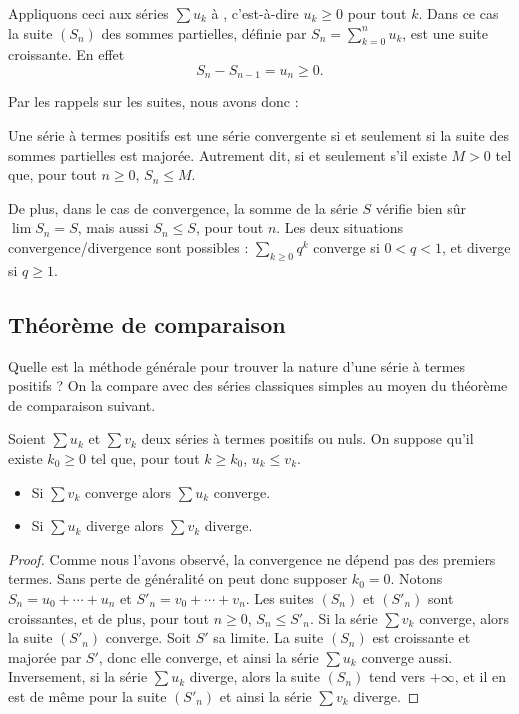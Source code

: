 \documentclass[class=report,crop=false]{standalone}
\begin{document}
Appliquons ceci aux séries $\sum u_k$ à , 
c'est-à-dire $u_k\ge 0$ pour tout $k$.
Dans ce cas la suite $(S_n)$ des sommes partielles, définie par 
$S_n = \sum_{k=0}^n u_k$, est une suite croissante.
En effet 
$$S_{n}-S_{n-1} = u_n \ge 0.$$

Par les rappels sur les suites, nous avons donc :
\begin{proposition}
\label{somme}
Une série à termes positifs est une série convergente si et seulement si 
la suite des sommes partielles est majorée.
Autrement dit, si et seulement s'il existe $M>0$
tel que, pour tout $n\ge 0$, $S_n \le M$.
\end{proposition}

De plus, dans le cas de convergence, la somme de la série
$S$ vérifie bien sûr $\lim S_n = S$, 
mais aussi $S_n \le S$, pour tout $n$.
Les deux situations convergence/divergence sont possibles :
$\sum_{k\ge0} q^k$ converge si $0<q<1$, et diverge si $q \ge 1$.



\subsection{Théorème de comparaison}

Quelle est la méthode générale pour trouver la nature d'une série à termes positifs ?
On la compare avec des séries classiques simples au moyen du théorème de comparaison suivant.

\begin{theoreme}
\label{th:comparaisonseries}
Soient $\sum u_k$ et $\sum v_k$ deux séries à termes positifs ou nuls. On
suppose qu'il existe $k_0\ge 0$ tel que, pour tout $k\ge k_0$, 
$u_k \le v_k$.
\begin{itemize}
\item Si $\sum v_k$ converge alors $\sum u_k$ converge.
\item Si $\sum u_k$ diverge alors $\sum v_k$ diverge.
\end{itemize}
\end{theoreme}

\begin{proof}
Comme nous l'avons observé, la convergence ne dépend pas des
premiers termes. Sans perte de généralité on peut donc supposer $k_0=0$.
Notons $S_n=u_0+\cdots+u_n$ et $S'_n = v_0+\cdots+v_n$. 
Les suites $(S_n)$ et $(S'_n)$ sont croissantes, et de plus, pour tout $n \ge 0$,
$S_n\le S'_n$. Si la série $\sum v_k$ converge, alors la suite
$(S'_n)$ converge. Soit $S'$ sa limite. La suite $(S_n)$ est croissante
et majorée par $S'$, donc elle converge, et ainsi la série $\sum u_k$
converge aussi. Inversement, si la série $\sum u_k$ diverge, alors
la suite $(S_n)$ tend vers $+\infty$, et il en est de même pour la
suite $(S'_n)$ et ainsi la série $\sum v_k$ diverge. 
\end{proof}
\end{document}
